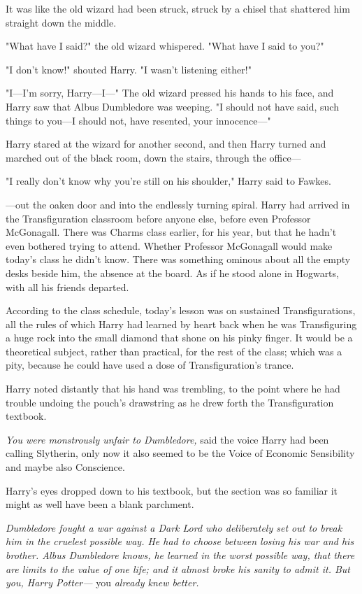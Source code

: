 It was like the old wizard had been struck, struck by a chisel that shattered 
him straight down the middle.

"What have I said?" the old wizard whispered. "What have I said to you?"

"I don't know!" shouted Harry. "I wasn't listening either!"

"I---I'm sorry, Harry---I---" The old wizard pressed his hands to his face, and 
Harry saw that Albus Dumbledore was weeping. "I should not have said, such 
things to you---I should not, have resented, your innocence---"

Harry stared at the wizard for another second, and then Harry turned and 
marched out of the black room, down the stairs, through the office---

"I really don't know why you're still on his shoulder," Harry said to Fawkes.

---out the oaken door and into the endlessly turning spiral.
\sbreak
Harry had arrived in the Transfiguration classroom before anyone else, before 
even Professor McGonagall. There was Charms class earlier, for his year, but 
that he hadn't even bothered trying to attend. Whether Professor McGonagall 
would make today's class he didn't know. There was something ominous about all 
the empty desks beside him, the absence at the board. As if he stood alone in 
Hogwarts, with all his friends departed.

According to the class schedule, today's lesson was on sustained 
Transfigurations, all the rules of which Harry had learned by heart back when 
he was Transfiguring a huge rock into the small diamond that shone on his pinky 
finger. It would be a theoretical subject, rather than practical, for the rest 
of the class; which was a pity, because he could have used a dose of 
Transfiguration's trance.

Harry noted distantly that his hand was trembling, to the point where he had 
trouble undoing the pouch's drawstring as he drew forth the Transfiguration 
textbook.

\emph{You were monstrously unfair to Dumbledore,} said the voice Harry had been 
calling Slytherin, only now it also seemed to be the Voice of Economic 
Sensibility and maybe also Conscience.

Harry's eyes dropped down to his textbook, but the section was so familiar it 
might as well have been a blank parchment.

\emph{Dumbledore fought a war against a Dark Lord who deliberately set out to 
break him in the cruelest possible way. He had to choose between losing his war 
and his brother. Albus Dumbledore knows, he learned in the worst possible way, 
that there are limits to the value of one life; and it almost broke his sanity 
to admit it. But you, Harry Potter---} you \emph{already knew better.}

